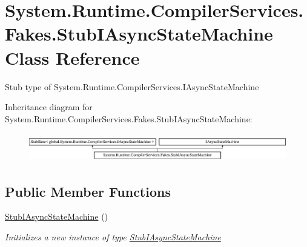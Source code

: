 \hypertarget{class_system_1_1_runtime_1_1_compiler_services_1_1_fakes_1_1_stub_i_async_state_machine}{\section{System.\-Runtime.\-Compiler\-Services.\-Fakes.\-Stub\-I\-Async\-State\-Machine Class Reference}
\label{class_system_1_1_runtime_1_1_compiler_services_1_1_fakes_1_1_stub_i_async_state_machine}
}


Stub type of System.\-Runtime.\-Compiler\-Services.\-I\-Async\-State\-Machine 


Inheritance diagram for System.\-Runtime.\-Compiler\-Services.\-Fakes.\-Stub\-I\-Async\-State\-Machine\-:\begin{figure}[H]
\begin{center}
\leavevmode
\includegraphics[height=1.252796cm]{class_system_1_1_runtime_1_1_compiler_services_1_1_fakes_1_1_stub_i_async_state_machine}
\end{center}
\end{figure}
\subsection*{Public Member Functions}
\begin{DoxyCompactItemize}
\item 
\hyperlink{class_system_1_1_runtime_1_1_compiler_services_1_1_fakes_1_1_stub_i_async_state_machine_a1361b89066cb84d763e781b2e4f34305}{Stub\-I\-Async\-State\-Machine} ()
\begin{DoxyCompactList}\small\item\em Initializes a new instance of type \hyperlink{class_system_1_1_runtime_1_1_compiler_services_1_1_fakes_1_1_stub_i_async_state_machine}{Stub\-I\-Async\-State\-Machine}\end{DoxyCompactList}\end{DoxyCompactItemize}
